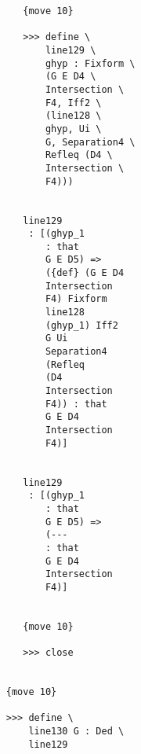 \documentclass[12pt]{article}
\begin{document}
\begin{verbatim}
                                 {move 10}

                                 >>> define \
                                     line129 \
                                     ghyp : Fixform \
                                     (G E D4 \
                                     Intersection \
                                     F4, Iff2 \
                                     (line128 \
                                     ghyp, Ui \
                                     G, Separation4 \
                                     Refleq (D4 \
                                     Intersection \
                                     F4)))


                                 line129 
                                  : [(ghyp_1 
                                     : that 
                                     G E D5) => 
                                     ({def} (G E D4 
                                     Intersection 
                                     F4) Fixform 
                                     line128 
                                     (ghyp_1) Iff2 
                                     G Ui 
                                     Separation4 
                                     (Refleq 
                                     (D4 
                                     Intersection 
                                     F4)) : that 
                                     G E D4 
                                     Intersection 
                                     F4)]


                                 line129 
                                  : [(ghyp_1 
                                     : that 
                                     G E D5) => 
                                     (--- 
                                     : that 
                                     G E D4 
                                     Intersection 
                                     F4)]


                                 {move 10}

                                 >>> close


                              {move 10}

                              >>> define \
                                  line130 G : Ded \
                                  line129



\end{verbatim}
\end{document}

